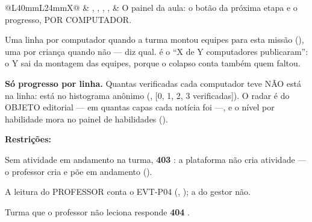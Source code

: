 \begin{tabularx}{\linewidth}{@{}L{40mm}L{24mm}X@{}}
\zebra {} & , , , ,  & O painel da aula: o botão da próxima etapa e o progresso, POR COMPUTADOR.\par Uma linha por computador quando a turma montou equipes para esta missão (), uma por criança quando não ---  diz qual.  é o \enquote{X de Y computadores publicaram}: o Y sai da montagem das equipes, porque o colapso conta também quem faltou.\par \textbf{Só progresso por linha.} Quantas verificadas cada computador teve NÃO está na linha: está no histograma anônimo (, [0, 1, 2, 3 verificadas]). O radar é do OBJETO editorial --- em quantas capas cada notícia foi ---, e o nível por habilidade mora no painel de habilidades ().\par \textbf{Restrições:}\par \hspace*{1em}\textbullet{} Sem atividade em andamento na turma, \textbf{403} : a plataforma não cria atividade --- o professor cria e põe em andamento ().\par \hspace*{1em}\textbullet{} A leitura do PROFESSOR conta o EVT-P04 (, ); a do gestor não.\par \hspace*{1em}\textbullet{} Turma que o professor não leciona responde \textbf{404} .\\

\end{tabularx}
